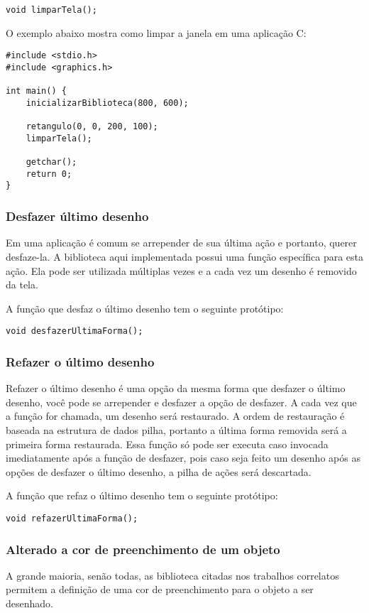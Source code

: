 \documentclass[12pt, %
openright,
oneside, %
a4paper,    %
brazil]{facom-ufu-abntex2}
\begin{document}
\begin{lstlisting}
void limparTela();
\end{lstlisting}

O exemplo abaixo mostra como limpar a janela em uma aplicação C:

\begin{lstlisting}
#include <stdio.h>
#include <graphics.h>

int main() {
    inicializarBiblioteca(800, 600);

    retangulo(0, 0, 200, 100);
    limparTela();

    getchar();
    return 0;
}
\end{lstlisting}

\subsubsection{Desfazer último desenho}
Em uma aplicação é comum se arrepender de sua última ação e portanto, querer desfaze-la. A biblioteca aqui implementada possui uma função específica para esta ação. Ela pode ser utilizada múltiplas vezes e a cada vez um desenho é removido da tela.

A função que desfaz o último desenho tem o seguinte protótipo:

\begin{lstlisting}
void desfazerUltimaForma();
\end{lstlisting}

\subsubsection{Refazer o último desenho}
Refazer o último desenho é uma opção da mesma forma que desfazer o último desenho, você pode se arrepender e desfazer a opção de desfazer. A cada vez que a função for chamada, um desenho será restaurado. A ordem de restauração é baseada na estrutura de dados pilha, portanto a última forma removida será a primeira forma restaurada. Essa função só pode ser executa caso invocada imediatamente após a função de desfazer, pois caso seja feito um desenho após as opções de desfazer o último desenho, a pilha de ações será descartada.

A função que refaz o último desenho tem o seguinte protótipo:

\begin{lstlisting}
void refazerUltimaForma();
\end{lstlisting}

\subsubsection{Alterado a cor de preenchimento de um objeto}
A grande maioria, senão todas, as biblioteca citadas nos trabalhos correlatos permitem a definição de uma cor de preenchimento para o objeto a ser desenhado.
\end{document}
